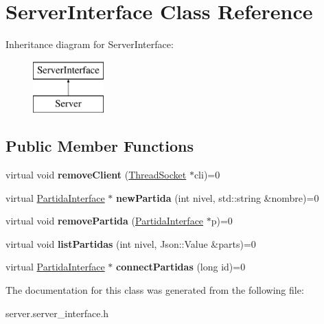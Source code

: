 \hypertarget{classServerInterface}{\section{Server\-Interface Class Reference}
\label{classServerInterface}
}
Inheritance diagram for Server\-Interface\-:\begin{figure}[H]
\begin{center}
\leavevmode
\includegraphics[height=2.000000cm]{classServerInterface}
\end{center}
\end{figure}
\subsection*{Public Member Functions}
\begin{DoxyCompactItemize}
\item 
\hypertarget{classServerInterface_a9f50fb72f2b1f039a5b0ed87fafe4446}{virtual void {\bfseries remove\-Client} (\hyperlink{classThreadSocket}{Thread\-Socket} $\ast$cli)=0}\label{classServerInterface_a9f50fb72f2b1f039a5b0ed87fafe4446}

\item 
\hypertarget{classServerInterface_a6dff7955b7dce57f18d8b5cb37602a67}{virtual \hyperlink{classPartidaInterface}{Partida\-Interface} $\ast$ {\bfseries new\-Partida} (int nivel, std\-::string \&nombre)=0}\label{classServerInterface_a6dff7955b7dce57f18d8b5cb37602a67}

\item 
\hypertarget{classServerInterface_ad17e40c4c3823ab6b52a9a82cfd55c4b}{virtual void {\bfseries remove\-Partida} (\hyperlink{classPartidaInterface}{Partida\-Interface} $\ast$p)=0}\label{classServerInterface_ad17e40c4c3823ab6b52a9a82cfd55c4b}

\item 
\hypertarget{classServerInterface_ac1a109664797797594773dd4881230cb}{virtual void {\bfseries list\-Partidas} (int nivel, Json\-::\-Value \&parts)=0}\label{classServerInterface_ac1a109664797797594773dd4881230cb}

\item 
\hypertarget{classServerInterface_a0ef2aa76b2b0c254ae96a8e737f9ef49}{virtual \hyperlink{classPartidaInterface}{Partida\-Interface} $\ast$ {\bfseries connect\-Partidas} (long id)=0}\label{classServerInterface_a0ef2aa76b2b0c254ae96a8e737f9ef49}

\end{DoxyCompactItemize}


The documentation for this class was generated from the following file\-:\begin{DoxyCompactItemize}
\item 
server.\-server\-\_\-interface.\-h\end{DoxyCompactItemize}
